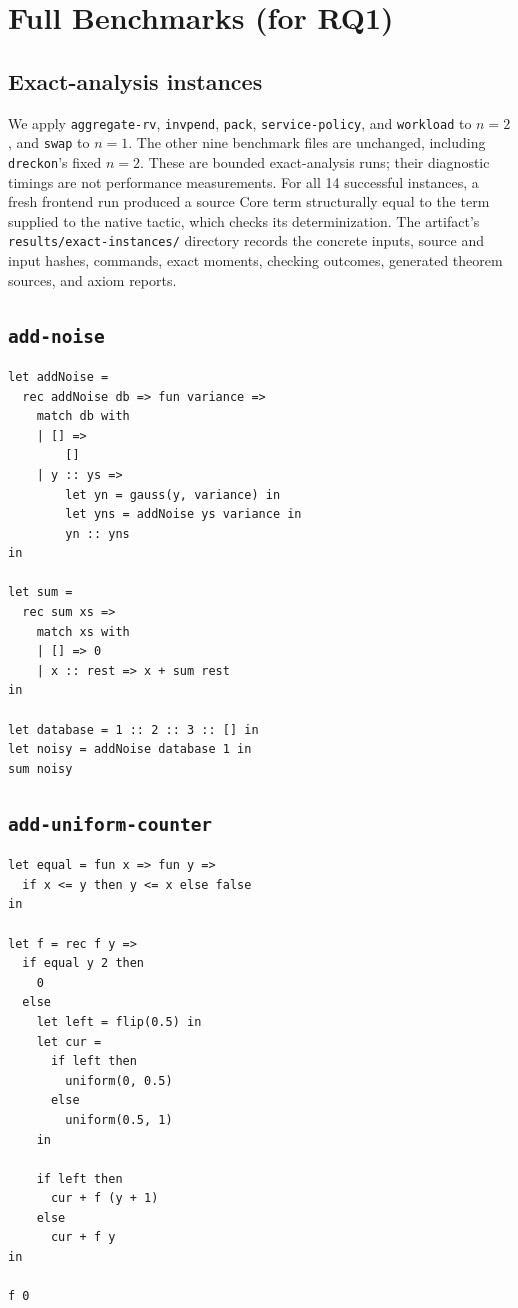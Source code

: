 \section{Full Benchmarks (for RQ1)}
\label{sec:appendix-finite-benchmarks}

\subsection{Exact-analysis instances}
\label{sec:appendix-exact-instances}
We apply \texttt{aggregate-rv}, \texttt{invpend}, \texttt{pack}, \texttt{service-policy}, and \texttt{workload} to $n=2$, and \texttt{swap} to $n=1$. The other nine benchmark files are unchanged, including \texttt{dreckon}'s fixed $n=2$. These are bounded exact-analysis runs; their diagnostic timings are not performance measurements. For all 14 successful instances, a fresh frontend run produced a source Core term structurally equal to the term supplied to the native tactic, which checks its determinization. The artifact's \texttt{results/exact-instances/} directory records the concrete inputs, source and input hashes, commands, exact moments, checking outcomes, generated theorem sources, and axiom reports.

\subsection{\texttt{add-noise}}

\begin{lstlisting}[breaklines=true]
let addNoise =
  rec addNoise db => fun variance =>
    match db with
    | [] =>
        []
    | y :: ys =>
        let yn = gauss(y, variance) in
        let yns = addNoise ys variance in
        yn :: yns
in

let sum =
  rec sum xs =>
    match xs with
    | [] => 0
    | x :: rest => x + sum rest
in

let database = 1 :: 2 :: 3 :: [] in
let noisy = addNoise database 1 in
sum noisy
\end{lstlisting}

\subsection{\texttt{add-uniform-counter}}

\begin{lstlisting}[breaklines=true]
let equal = fun x => fun y =>
  if x <= y then y <= x else false
in

let f = rec f y =>
  if equal y 2 then
    0
  else
    let left = flip(0.5) in
    let cur =
      if left then
        uniform(0, 0.5)
      else
        uniform(0.5, 1)
    in

    if left then
      cur + f (y + 1)
    else
      cur + f y
in

f 0
\end{lstlisting}

